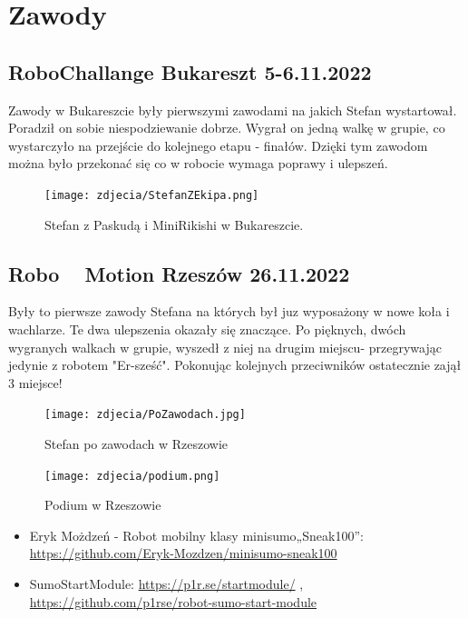\documentclass[polish,polish,a4paper]{article}
\begin{document}
\section{Zawody}
    \subsection{RoboChallange Bukareszt 5-6.11.2022}
    Zawody w Bukareszcie były pierwszymi zawodami na jakich Stefan wystartował. Poradził on sobie niespodziewanie dobrze. Wygrał on jedną walkę w grupie, co wystarczyło na przejście do kolejnego etapu - finałów. Dzięki tym zawodom można było przekonać się co w robocie wymaga poprawy i ulepszeń. 
    
    \begin{figure}[ht!]
        \centering
        \texttt{[image: zdjecia/StefanZEkipa.png]}
        \caption{Stefan z Paskudą i MiniRikishi w Bukareszcie. \label{overflow}}
        \end{figure}
    
    \subsection{Robo ~ Motion Rzeszów 26.11.2022}
    Były to pierwsze zawody Stefana na których był juz wyposażony w nowe koła i wachlarze. Te dwa ulepszenia okazały się znaczące. Po pięknych, dwóch wygranych walkach w grupie, wyszedł z niej na drugim miejscu- przegrywając jedynie z robotem "Er-sześć". Pokonując kolejnych przeciwników ostatecznie zajął 3 miejsce!

    \begin{figure}[!htb]
       \begin{minipage}{0.3\textwidth}
         \centering
         \texttt{[image: zdjecia/PoZawodach.jpg]}
         \caption{Stefan po zawodach w Rzeszowie}\label{Fig:Data1}
       \end{minipage}\hspace{30mm}
       \begin{minipage}{0.3\textwidth}
         \centering
         \texttt{[image: zdjecia/podium.png]}
         \caption{Podium w Rzeszowie}\label{Fig:Data2}
       \end{minipage}
        \end{figure}
    

\newpage


\begin{itemize}
  \item Eryk Możdzeń - Robot mobilny klasy minisumo„Sneak100”: \url{https://github.com/Eryk-Mozdzen/minisumo-sneak100}
  \item SumoStartModule: \url{https://p1r.se/startmodule/} , \url{https://github.com/p1rse/robot-sumo-start-module}

\end{itemize}
\end{document}
